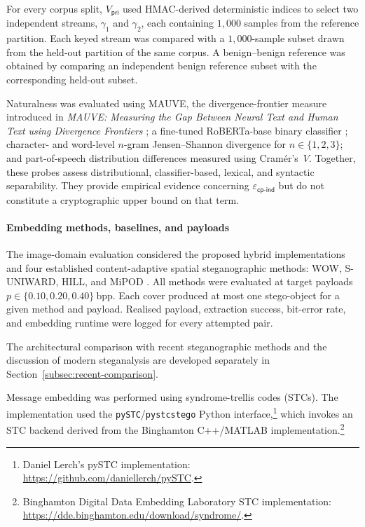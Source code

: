\documentclass[pdflatex,sn-mathphys-num]{sn-jnl}%
\theoremstyle{definition}
\theoremstyle{game}
\theoremstyle{thmstyleone}%
\theoremstyle{thmstyletwo}%
\theoremstyle{thmstylethree}%
\begin{document}
For every corpus split, $V_{\mathsf{pri}}$ used HMAC-derived
deterministic indices to select two independent streams,
$\gamma_1$ and $\gamma_2$, each containing $1{,}000$ samples from
the reference partition. Each keyed stream was compared with a
$1{,}000$-sample subset drawn from the held-out partition of the
same corpus. A benign--benign reference was obtained by comparing an
independent benign reference subset with the corresponding held-out
subset.

Naturalness was evaluated using MAUVE, the divergence-frontier
measure introduced in \emph{MAUVE: Measuring the Gap Between Neural Text and Human Text using Divergence Frontiers}
\cite{pillutla2021mauve}; a fine-tuned RoBERTa-base binary
classifier \cite{liu2019roberta}; character- and word-level
$n$-gram Jensen--Shannon divergence for $n\in\{1,2,3\}$; and part-of-speech distribution differences measured using Cramér's~$V$. Together, these probes assess distributional, classifier-based, lexical, and syntactic separability. They provide empirical evidence concerning $\varepsilon_{\mathsf{cp\text{-}ind}}$ but do not constitute a
cryptographic upper bound on that term.

\paragraph{Embedding methods, baselines, and payloads}\label{Embedding methods}
The image-domain evaluation considered the proposed hybrid implementations and four established content-adaptive spatial steganographic methods: WOW, S-UNIWARD, HILL, and MiPOD \cite{Holub2012WOW,holub2014universal,li2014new,sedighi2015content}. All methods were evaluated at target payloads $p\in\{0.10,0.20,0.40\}\ \text{bpp}$. Each cover produced at most one stego-object for a given method and payload. Realised payload, extraction success, bit-error rate, and embedding runtime were logged for every attempted pair.

The architectural comparison with recent steganographic methods and
the discussion of modern steganalysis are developed separately in
Section~\ref{subsec:recent-comparison}.

Message embedding was performed using syndrome-trellis codes (STCs). The implementation used the
\texttt{pySTC}/\texttt{pystcstego} Python interface,\footnote{Daniel
Lerch's pySTC implementation:
\url{https://github.com/daniellerch/pySTC}.}
which invokes an STC backend derived from the Binghamton
C++/MATLAB implementation.\footnote{Binghamton Digital Data
Embedding Laboratory STC implementation:
\url{https://dde.binghamton.edu/download/syndrome/}.}
\end{document}

